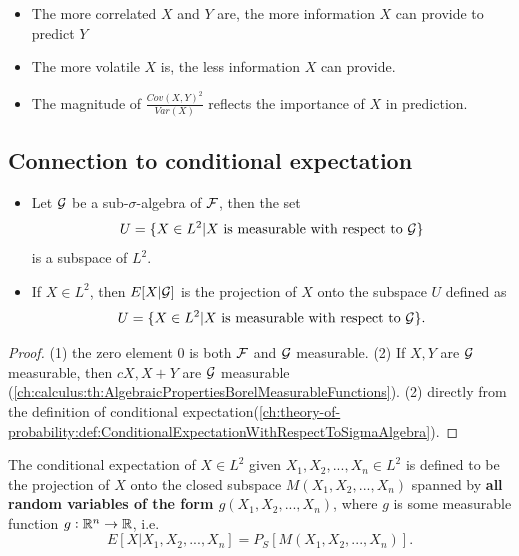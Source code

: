 \begin{refsection}
\begin{remark}\hfill
\begin{itemize}
    \item The more correlated $X$ and $Y$ are, the more information $X$ can provide to predict $Y$
    \item The more volatile $X$ is, the less information $X$ can provide. 
    \item The magnitude of $\frac{Cov(X,Y)^2}{Var(X)}$ reflects the importance of $X$ in prediction.
\end{itemize}

\end{remark}


\subsection{Connection to conditional expectation}
\begin{theorem}\hfill
\begin{itemize}
	\item 	Let $\mathcal{G}$ be a sub-$\sigma$-algebra of $\mathcal{F}$, then the set
	$$U=\{X\in L^2| X ~\text{is measurable with respect to}~ \mathcal{G}\}$$
	is a subspace of $L^2$.
	\item If $X\in L^2$, then $E[X|\mathcal{G}]$ is the projection of $X$ onto the subspace $U$ defined as
	$$U=\{X\in L^2| X ~\text{is measurable with respect to} ~ \mathcal{G}\}.$$
\end{itemize}	
\end{theorem}
\begin{proof}
(1)	 the zero element 0 is both $\mathcal{F}$ and $\mathcal{G}$ measurable. (2) If $X,Y$ are $\mathcal{G}$ measurable, then $cX,X+Y$ are $\mathcal{G}$ measurable (\autoref{ch:calculus:th:AlgebraicPropertiesBorelMeasurableFunctions}). 
(2)	directly from the definition of conditional expectation(\autoref{ch:theory-of-probability:def:ConditionalExpectationWithRespectToSigmaAlgebra}).
\end{proof}

\begin{definition}
	The conditional expectation of $X\in L^2$ given $X_1,X_2,...,X_n\in L^2$ is defined to be the projection of $X$ onto the closed subspace $M(X_1,X_2,...,X_n)$ spanned by \textbf{all random variables of the form $g(X_1,X_2,...,X_n)$}, where $g$ is some measurable function $g:\mathbb{R}^n\to \mathbb{R}$, i.e. 
	$$E[X|X_1,X_2,...,X_n] = P_S[M(X_1,X_2,...,X_n)].$$	
\end{definition}



\end{refsection}
